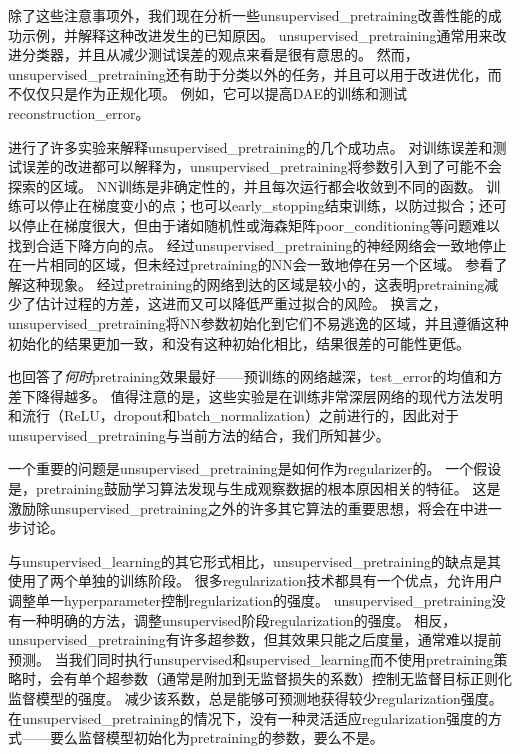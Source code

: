 除了这些注意事项外，我们现在分析一些\gls{unsupervised_pretraining}改善性能的成功示例，并解释这种改进发生的已知原因。
\gls{unsupervised_pretraining}通常用来改进分类器，并且从减少测试误差的观点来看是很有意思的。
然而，\gls{unsupervised_pretraining}还有助于分类以外的任务，并且可以用于改进优化，而不仅仅只是作为正规化项。
例如，它可以提高\gls{DAE}的训练和测试\gls{reconstruction_error}\citep{Hinton-Science2006}。


\cite{Erhan+al-2010-small}进行了许多实验来解释\gls{unsupervised_pretraining}的几个成功点。
对训练误差和测试误差的改进都可以解释为，\gls{unsupervised_pretraining}将参数引入到了可能不会探索的区域。
\gls{NN}训练是非确定性的，并且每次运行都会收敛到不同的函数。
训练可以停止在梯度变小的点；也可以\gls{early_stopping}结束训练，以防过拟合；还可以停止在梯度很大，但由于诸如随机性或海森矩阵\gls{poor_conditioning}等问题难以找到合适下降方向的点。
经过\gls{unsupervised_pretraining}的神经网络会一致地停止在一片相同的区域，但未经过\gls{pretraining}的\gls{NN}会一致地停在另一个区域。
参看了解这种现象。
经过\gls{pretraining}的网络到达的区域是较小的，这表明\gls{pretraining}减少了估计过程的方差，这进而又可以降低严重过拟合的风险。
换言之，\gls{unsupervised_pretraining}将\gls{NN}参数初始化到它们不易逃逸的区域，并且遵循这种初始化的结果更加一致，和没有这种初始化相比，结果很差的可能性更低。


\cite{Erhan+al-2010-small}也回答了\emph{何时}\gls{pretraining}效果最好——预训练的网络越深，\gls{test_error}的均值和方差下降得越多。
值得注意的是，这些实验是在训练非常深层网络的现代方法发明和流行（\gls{ReLU}，\gls{dropout}和\gls{batch_normalization}）之前进行的，因此对于\gls{unsupervised_pretraining}与当前方法的结合，我们所知甚少。


一个重要的问题是\gls{unsupervised_pretraining}是如何作为\gls{regularizer}的。
一个假设是，\gls{pretraining}鼓励学习算法发现与生成观察数据的根本原因相关的特征。
这是激励除\gls{unsupervised_pretraining}之外的许多其它算法的重要思想，将会在中进一步讨论。


与\gls{unsupervised_learning}的其它形式相比，\gls{unsupervised_pretraining}的缺点是其使用了两个单独的训练阶段。
很多\gls{regularization}技术都具有一个优点，允许用户调整单一\gls{hyperparameter}控制\gls{regularization}的强度。
\gls{unsupervised_pretraining}没有一种明确的方法，调整\gls{unsupervised}阶段\gls{regularization}的强度。
相反，\gls{unsupervised_pretraining}有许多超参数，但其效果只能之后度量，通常难以提前预测。
当我们同时执行\gls{unsupervised}和\gls{supervised_learning}而不使用\gls{pretraining}策略时，会有单个超参数（通常是附加到无监督损失的系数）控制无监督目标正则化监督模型的强度。
减少该系数，总是能够可预测地获得较少\gls{regularization}强度。
在\gls{unsupervised_pretraining}的情况下，没有一种灵活适应\gls{regularization}强度的方式——要么监督模型初始化为\gls{pretraining}的参数，要么不是。

